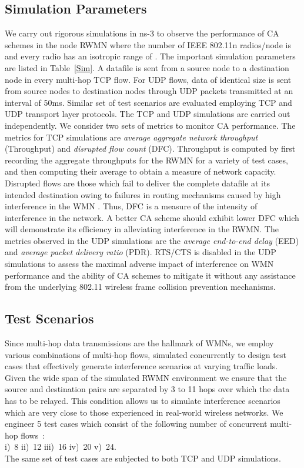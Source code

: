 \documentclass[conference]{IEEEtran}
\begin{document}
\subsection{Simulation Parameters}
We carry out rigorous simulations in ns-3 \cite{NS-3} to observe the performance of CA schemes in the  node RWMN where the number of IEEE 802.11n radios/node is  and every radio has an isotropic range of . The important simulation parameters are listed in Table~\ref{Sim}. A datafile is sent from a source node to a destination node in every multi-hop TCP flow. For UDP flows, data of identical size is sent from source nodes to destination nodes through UDP packets transmitted at an interval of 50ms. Similar set of test scenarios are evaluated employing TCP and UDP transport layer protocols. The TCP and UDP simulations are carried out independently. We consider two sets of metrics to monitor CA performance. The metrics for TCP simulations are \textit{average aggregate network throughput} (Throughput) and \textit{disrupted flow count} (DFC). Throughput is computed by first recording the aggregate throughputs for the RWMN for a variety of test cases, and then computing their average to obtain a 
measure of network capacity. Disrupted flows are those which fail to deliver the complete datafile at its intended destination owing to failures in routing mechanisms caused by high interference in the WMN 
\cite{Manas}. Thus, DFC is a measure of the intensity of interference in the network. A better CA scheme should exhibit lower DFC which will demonstrate its efficiency in alleviating interference in the RWMN. The metrics observed in the UDP simulations are the \textit{average end-to-end delay} (EED) and \textit{average packet delivery ratio} (PDR). RTS/CTS is disabled in the UDP simulations to assess the maximal adverse impact of interference on WMN performance and the ability of CA schemes to mitigate it without any assistance from the underlying 802.11 wireless frame collision prevention mechanisms. 

\subsection{Test Scenarios}
Since multi-hop data transmissions are the hallmark of WMNs, we employ various combinations of multi-hop flows, simulated concurrently to design test cases that effectively generate interference scenarios at varying traffic loads. Given the wide span of the simulated RWMN environment we ensure that the source and destination pairs are separated by 3 to 11 hops over which the data has to be relayed. This condition allows us to simulate interference scenarios which are very close to those experienced in real-world wireless networks. We engineer 5 test cases which consist of the following number of concurrent multi-hop flows~: \\ \quad i)~8 \quad ii)~12 \quad iii)~16 \quad iv)~20 \quad  v)~24.\\
The same set of test cases are subjected to both TCP and UDP simulations. 
\end{document}
